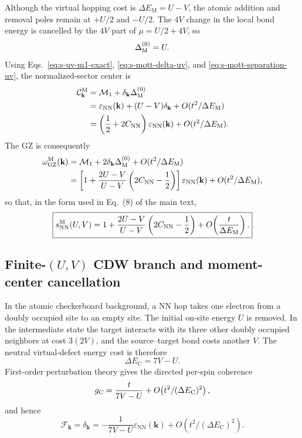 \documentclass[10pt]{article}
\newcommand{\epsk}{\varepsilon_{\mathrm{NN}}(\mathbf{k})}
\newcommand{\wzero}{\omega_{\mathrm{GZ}}}
\newcommand{\Cnn}{C_{\mathrm{NN}}}
\newcommand{\dk}{\delta_{\mathbf{k}}}
\begin{document}
Although the virtual hopping cost is $\Delta E_{\mathrm M}=U-V$, the atomic addition and
removal poles remain at $+U/2$ and $-U/2$. The $4V$ change in the local bond
energy is cancelled by the $4V$ part of $\mu=U/2+4V$, so
\begin{equation}
 \Delta_{\rm M}^{(0)}=U .
 \label{eq:s-mott-separation-uv}
\end{equation}
Using Eqs.~\ref{eq:s-uv-m1-exact},
\ref{eq:s-mott-delta-uv}, and
\ref{eq:s-mott-separation-uv}, the normalized-sector center is
\begin{align}
 \mathcal C_{\mathbf k}^{\rm M}
 &=\mathcal M_1+\dk\Delta_{\rm M}^{(0)}\nonumber\\
 &=\epsk+(U-V)\dk+O(t^2/\Delta E_{\mathrm M})\nonumber\\
 &=\left(\frac12+2\Cnn\right)\epsk+O(t^2/\Delta E_{\mathrm M}).
 \label{eq:s-mott-center-uv}
\end{align}
The GZ is consequently
\begin{align}
 \wzero^{\rm M}(\mathbf k)
 &=\mathcal M_1+2\dk\Delta_{\rm M}^{(0)}+O(t^2/\Delta E_{\mathrm M})\nonumber\\
 &=\left[1+\frac{2U-V}{U-V}
 \left(2\Cnn-\frac12\right)\right]\epsk+O(t^2/\Delta E_{\mathrm M}),
 \label{eq:s-mott-result-uv}
\end{align}
so that, in the form used in Eq.~(8) of the main text,
\begin{equation}
 \boxed{
 s_{\mathrm{NN}}^{\rm M}(U,V)
 =1+\frac{2U-V}{U-V}
 \left(2\Cnn-\frac12\right)
 +O\!\left(\frac{t}{\Delta E_{\mathrm M}}\right).}
 \label{eq:s-mott-scale-uv}
\end{equation}

\subsection{Finite-$(U,V)$ CDW branch and moment-center cancellation}
\label{sec:s-finite-uv-cdw}
In the atomic checkerboard background, a NN hop takes one electron from a
doubly occupied site to an empty site. The initial on-site energy $U$ is
removed. In the intermediate state the target interacts with its three other
doubly occupied neighbors at cost $3(2V)$, and the source--target bond costs
another $V$. The neutral virtual-defect energy cost is therefore
\begin{equation}
 \Delta E_{\mathrm C}=7V-U .
 \label{eq:s-cdw-denominator-uv}
\end{equation}
First-order perturbation theory gives the directed per-spin coherence
\begin{equation}
 g_{\rm C}=\frac{t}{7V-U}+O\!\left(t^2/(\Delta E_{\mathrm C})^2\right),
 \label{eq:s-cdw-coherence-uv}
\end{equation}
and hence
\begin{equation}
 \mathcal F_{\mathbf k}=\dk
 =-\frac{1}{7V-U}\epsk+O\!\left(t^2/(\Delta E_{\mathrm C})^2\right).
 \label{eq:s-cdw-delta-uv}
\end{equation}
\end{document}
